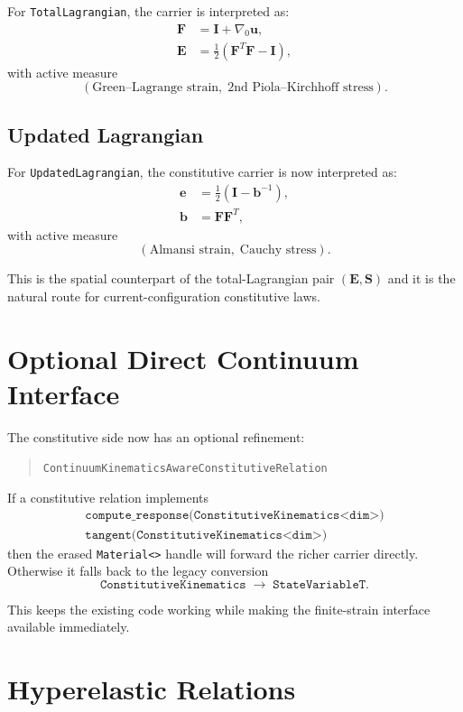 For \texttt{TotalLagrangian}, the carrier is interpreted as:
\begin{align}
  \mathbf{F} &= \mathbf{I} + \nabla_0 \mathbf{u}, \\
  \mathbf{E} &= \frac{1}{2}(\mathbf{F}^T\mathbf{F} - \mathbf{I}),
\end{align}
with active measure
\[
  (\text{Green--Lagrange strain},\; \text{2nd Piola--Kirchhoff stress}).
\]

\subsection*{Updated Lagrangian}

For \texttt{UpdatedLagrangian}, the constitutive carrier is now interpreted as:
\begin{align}
  \mathbf{e} &= \frac{1}{2}\left(\mathbf{I} - \mathbf{b}^{-1}\right), \\
  \mathbf{b} &= \mathbf{F}\mathbf{F}^T,
\end{align}
with active measure
\[
  (\text{Almansi strain},\; \text{Cauchy stress}).
\]

This is the spatial counterpart of the total-Lagrangian pair
$(\mathbf{E},\mathbf{S})$ and it is the natural route for current-configuration
constitutive laws.

\section{Optional Direct Continuum Interface}

The constitutive side now has an optional refinement:
\begin{quote}
\texttt{ContinuumKinematicsAwareConstitutiveRelation}
\end{quote}

If a constitutive relation implements
\begin{align}
  \texttt{compute\_response(ConstitutiveKinematics<dim>)} \\
  \texttt{tangent(ConstitutiveKinematics<dim>)}
\end{align}
then the erased \texttt{Material<>} handle will forward the richer carrier
directly. Otherwise it falls back to the legacy conversion
\[
  \texttt{ConstitutiveKinematics} \;\to\; \texttt{StateVariableT}.
\]

This keeps the existing code working while making the finite-strain interface
available immediately.

\section{Hyperelastic Relations}

